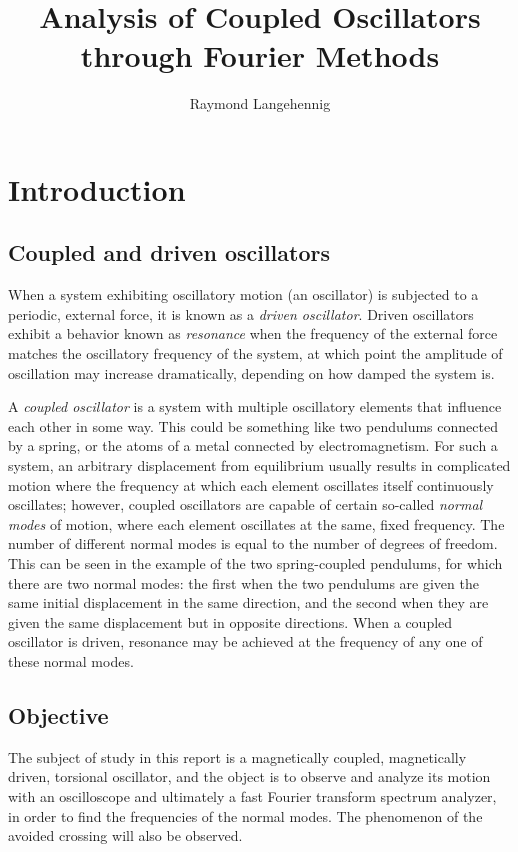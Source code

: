 \documentclass{article}
\title{Analysis of Coupled Oscillators through Fourier Methods}
\author{Raymond Langehennig}
\begin{document}
\maketitle


\section{Introduction}

\subsection{Coupled and driven oscillators}
When a system exhibiting oscillatory motion (an oscillator) is subjected to a periodic, external force, it is known as a \emph{driven oscillator}. Driven oscillators exhibit a behavior known as \emph{resonance} when the frequency of the external force matches the oscillatory frequency of the system, at which point the amplitude of oscillation may increase dramatically, depending on how damped the system is.

A \emph{coupled oscillator} is a system with multiple oscillatory elements that influence each other in some way. This could be something like two pendulums connected by a spring, or the atoms of a metal connected by electromagnetism. For such a system, an arbitrary displacement from equilibrium usually results in complicated motion where the frequency at which each element oscillates itself continuously oscillates; however, coupled oscillators are capable of certain so-called \emph{normal modes} of motion, where each element oscillates at the same, fixed frequency. The number of different normal modes is equal to the number of degrees of freedom. This can be seen in the example of the two spring-coupled pendulums, for which there are two normal modes: the first when the two pendulums are given the same initial displacement in the same direction, and the second when they are given the same displacement but in opposite directions. When a coupled oscillator is driven, resonance may be achieved at the frequency of any one of these normal modes.

\subsection{Objective}
The subject of study in this report is a magnetically coupled, magnetically driven, torsional oscillator, and the object is to observe and analyze its motion with an oscilloscope and ultimately a fast Fourier transform spectrum analyzer, in order to find the frequencies of the normal modes. The phenomenon of the avoided crossing will also be observed.
\end{document}
